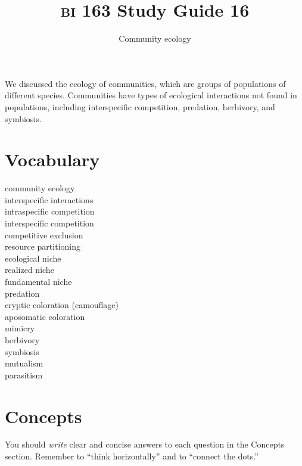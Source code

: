 \documentclass[letterpaper]{tufte-handout}
\title{{\scshape bi} 163 Study Guide 16}
\author{Community ecology}
\date{} %
\begin{document}
\maketitle	%

We discussed the ecology of communities, which are groups of populations of different species.  Communities have types of ecological interactions not found in populations, including interspecific competition, predation, herbivory, and symbiosis.

\section*{Vocabulary}

\vspace{-1\baselineskip}
\begin{multicols}{2}
community ecology\\
interspecific interactions\\
intraspecific competition\\
interspecific competition\\
competitive exclusion\\
resource partitioning\\
ecological niche\\
realized niche\\
fundamental niche\\
predation \\
cryptic coloration (camouflage)\\
aposomatic coloration\\
mimicry\\
herbivory \\
symbiosis\\
mutualism\\
parasitism
\end{multicols}

\section*{Concepts}

You should \emph{write} clear and concise answers to each question in the Concepts section.  Remember to ``think horizontally'' and to ``connect the dots.'' 
\end{document}
